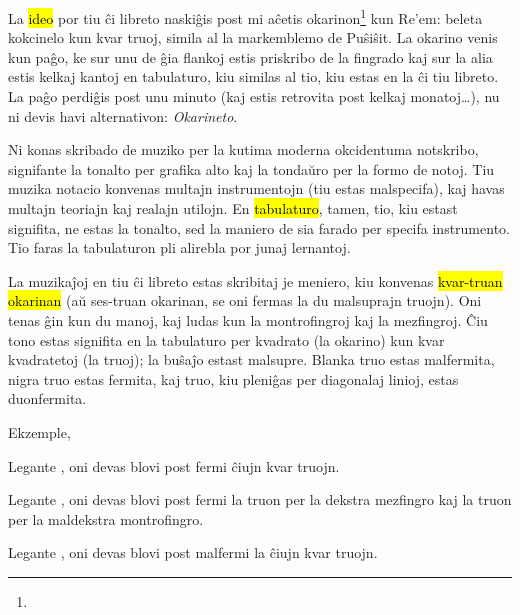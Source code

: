
La \hl{ideo} por tiu ĉi libreto naskiĝis post mi aĉetis okarinon\footnote{} kun Re’em: beleta kokcinelo kun kvar truoj, simila al la markemblemo de Puŝiŝit. La okarino venis kun paĝo, ke sur unu de ĝia flankoj estis priskribo de la fingrado kaj sur la alia estis kelkaj kantoj en tabulaturo, kiu similas al tio, kiu estas en la ĉi tiu libreto. La paĝo perdiĝis post unu minuto (kaj estis retrovita post kelkaj monatoj…), nu ni devis havi alternativon: \emph{Okarineto}.



Ni konas skribado de muziko per la kutima moderna okcidentuma notskribo, signifante la tonalto per grafika alto kaj la tondaŭro per la formo de notoj. Tiu muzika notacio konvenas multajn instrumentojn (tiu estas malspecifa), kaj havas multajn teoriajn kaj realajn utilojn. En \hl{tabulaturo}, tamen, tio, kiu estast signifita, ne estas la tonalto, sed la maniero de sia farado per specifa instrumento. Tio faras la tabulaturon pli alirebla por junaj lernantoj.

La muzikaĵoj en tiu ĉi libreto estas skribitaj je meniero, kiu konvenas \hl{kvar-truan okarinan} (aŭ ses-truan okarinan, se oni fermas la du malsuprajn truojn). Oni tenas ĝin kun du manoj, kaj ludas kun la montrofingroj kaj la mezfingroj. Ĉiu tono estas signifita en la tabulaturo per kvadrato (la okarino) kun kvar kvadratetoj (la truoj); la buŝaĵo estast malsupre. Blanka truo estas malfermita, nigra truo estas fermita, kaj truo, kiu pleniĝas per diagonalaj linioj, estas duonfermita.

Ekzemple,
\begin{compactitem}
	\item Legante \enliniatabulaturo{\c}, oni devas blovi post fermi ĉiujn kvar truojn.
	\item Legante \enliniatabulaturo{\gis}, oni devas blovi post fermi la truon per la dekstra mezfingro kaj la truon per la maldekstra montrofingro.
	\item Legante \enliniatabulaturo{\C}, oni devas blovi post malfermi la ĉiujn kvar truojn.
\end{compactitem}

